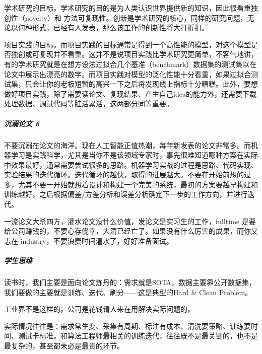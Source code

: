 \documentclass[letterpaper,10pt,english]{sphinxmanual}
\begin{document}
学术研究的目标。学术研究的目的是为人类认识世界提供新的知识，因此很看重独创性（novelty）和
方法可复现性。创新是学术研究的核心，同样的研究问题，无论以何种形式，已经有人发表，那么该工作的创新性将大打折扣。

项目实践的目标。而项目实践的目标通常是得到一个高性能的模型，对这个模型是否独创或可复现并不看重。这并不是说项目实践比学术研究更简单，不客气地讲，有的学术研究就是在想方设法过拟合几个基准（benchmark）数据集的测试集以在论文中展示出漂亮的数字。而项目实践对模型的泛化性能十分看重，如果过拟合测试集，只会让你的老板短暂的高兴一下之后将发现线上指标十分糟糕。此外，要想做好项目实践，除了需要读论文、复现结果、产生自己idea的能力外，还需要下载处理数据、调试代码等脏活累活，这两部分同等重要。


\subparagraph{沉溺论文 6\sphinxfootnotemark[298]}
\label{\detokenize{chapter_introduction/AI_PM:id29}}%
\begin{footnotetext}[298]\sphinxAtStartFootnote
{}
%
\end{footnotetext}\ignorespaces 
不要沉溺在论文的海洋。现在人工智能正值热潮，每年新发表的论文非常多。而机器学习是实践科学，尤其是当你不是该领域专家时，事先很难知道哪种方案在实际中效果最好，通常需要尝试很多的思路。机器学习实战的过程是思路、代码实现、实验结果的迭代循环。迭代循环的越快，取得的进展越大。不要在开始前想的过多，尤其不要一开始就想着设计和构建一个完美的系统，最初的方案要越早构建和训练越好，之后根据偏差/方差分析和误差分析确定下一步的工作方向，并进行迭代。

一流论文大杀四方，灌水论文没什么价值，发论文是实习生的工作，full\sphinxhyphen{}time
是要给公司赚钱的，不要心存侥幸，大清已经亡了。如果没有什么厉害的成果，而你又志在
industry，不要浪费时间灌水了，好好准备面试。
%
\begin{footnote}[299]\sphinxAtStartFootnote
{}
%
\end{footnote}


\subparagraph{学生思维}
\label{\detokenize{chapter_introduction/AI_PM:id30}}
读书时，我们主要是面向论文炼丹的：需求就是SOTA，数据主要靠公开数据集，我们要做的主要就是训练、迭代、刷分——这是典型的Hard
\& Clean Problem。

工业界不是这样的。公司是花钱请人来在用解决实际问题的。

实际情况往往是：需求常生变、采集有周期、标注有成本、清洗要策略、训练要时间、测试卡标准。和算法工程师最相关的训练迭代，往往既不是最关键的，也不是最复杂的，甚至都未必是最贵的环节。
\end{document}
